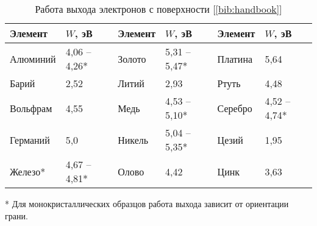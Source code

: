 \begin{labsupplement}
\begin{table}
\caption{Работа выхода электронов с поверхности [\ref{bib:handbook}]}
\small\centering
\begin{tabular}{ll||ll||ll}
\toprule[1pt]
Элемент &$W$, эВ& Элемент &$W$, эВ& Элемент &$W$, эВ\\
\midrule[1pt]
Алюминий& 4,06 -- 4,26* & Золото & 5,31 -- 5,47* & Платина & 5,64\\
Барий & 2,52 & Литий & 2,93  & Ртуть & 4,48\\
Вольфрам & 4,55 & Медь & 4,53 -- 5,10* & Серебро & 4,52 -- 4,74*\\
Германий & 5,0 & Никель & 5,04 -- 5,35* & Цезий & 1,95\\
Железо* & 4,67 -- 4,81* & Олово & 4,42 &  Цинк & 3,63\\
\bottomrule[1pt]
\end{tabular}\par
\smallskip
{\footnotesize
* Для монокристаллических образцов работа выхода зависит от ориентации грани.}
\end{table}



\end{labsupplement}
